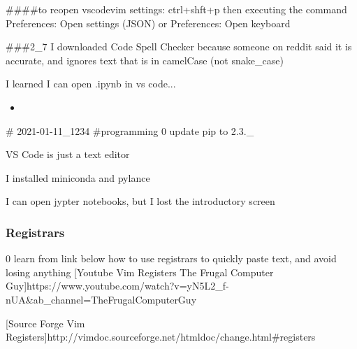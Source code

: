 \#\#\#\#to reopen vscodevim settings: ctrl+shft+p then executing the
command Preferences: Open settings (JSON) or Preferences: Open keyboard

\#\#\#2\_7 I downloaded Code Spell Checker because someone on reddit
said it is accurate, and ignores text that is in camelCase (not
snake\_case)

I learned I can open .ipynb in vs code...

\begin{itemize}
\tightlist
\item
\end{itemize}
# 2021-01-11_1234
#programming
0 update pip to 2.3.\_

VS Code is just a text editor

I installed miniconda and pylance

I can open jypter notebooks, but I lost the introductory screen

\hypertarget{registrars}{%
\subsubsection{Registrars}\label{registrars}}

0 learn from link below how to use registrars to quickly paste text, and
avoid losing anything
[Youtube Vim Registers The Frugal Computer Guy]{https://www.youtube.com/watch?v=yN5L2_f-nUA\&ab_channel=TheFrugalComputerGuy}

[Source Forge Vim Registers]{http://vimdoc.sourceforge.net/htmldoc/change.html\#registers}

